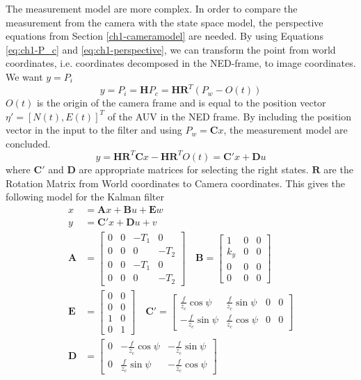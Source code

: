 	The measurement model are more complex. In order to compare the measurement from the camera with the
	state space model, the perspective equations from Section \ref{ch1-cameramodel} are needed. By using
	Equations \eqref{eq:ch1-P_c} and \eqref{eq:ch1-perspective}, we can transform the point from world
	coordinates, i.e. coordinates decomposed in the NED-frame, to image coordinates. We want $y = P_i$
	\begin{equation*}
		y = P_i = \mathbf{H} P_c = \mathbf{H R}^T ( P_w - O(t))
	\end{equation*}
	$O(t)$ is the origin of the camera frame and is equal to the position vector $\eta' = [N(t),
	E(t)]^T$ of the AUV in the NED frame. By including the position vector in the input to the filter and using 
	$P_w = \mathbf{C} x$, the measurement model are concluded.
	\begin{equation}
		\label{eq:ch2-measurement}
		y = \mathbf{H R}^T \mathbf{C} x - \mathbf{H R}^T  O(t) = \mathbf{C}'x + \mathbf{D} u
	\end{equation}
	where $\mathbf{C'}$ and $\mathbf{D}$ are appropriate matrices for selecting the right states.
$\mathbf{R}$
	are the Rotation Matrix from World coordinates to Camera coordinates. This gives the following model
	for the Kalman filter
	\begin{align}
		x &= \mathbf{A} x + \mathbf{B} u + \mathbf{E} w\\
		y &= \mathbf{C}'x + \mathbf{D} u + v\\
		\mathbf{A} &= \left [ \begin{matrix}
					0 & 0 & -T_1 & 0 \\
					0 & 0 & 0 & -T_2 \\
					0 & 0 & -T_1 & 0 \\
					0 & 0 & 0 & -T_2 
					\end{matrix} \right] \quad \mathbf{B} = \left[ \begin{matrix}
										1 & 0 & 0 \\
										k_y & 0 & 0\\
										0   & 0 & 0 \\
										0 & 0 & 0
										\end{matrix} \right]\\
		\mathbf{E} &= \left [ \begin{matrix}
					0 & 0 \\
					0 & 0 \\
					1 & 0 \\
					0 & 1
					\end{matrix} \right] \quad \mathbf{C}' = \left [ \begin{matrix}
						\frac{f}{z_c} \cos{\psi} &\frac{f}{z_c} \sin{\psi} & 0 & 0 \\
						-\frac{f}{z_c} \sin{\psi}& \frac{f}{z_c} \cos{\psi} & 0 & 0 
								\end{matrix} \right] \\
		\mathbf{D} &= \left [ \begin{matrix}
					0 & -\frac{f}{z_c} \cos{\psi} & -\frac{f}{z_c} \sin{\psi} \\
					0 & \frac{f}{z_c} \sin{\psi} & -\frac{f}{z_c} \cos{\psi}
					\end{matrix} \right]
	\end{align}

